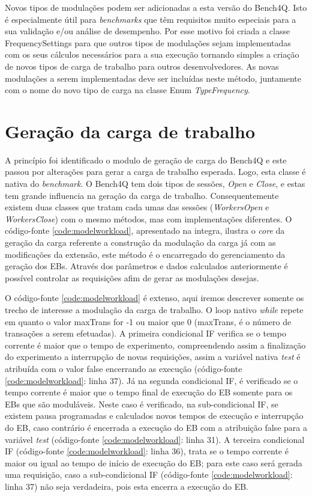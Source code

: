 Novos tipos de modulações podem ser adicionadas a esta versão do Bench4Q. Isto é especialmente útil para \textit{benchmarks} que têm requisitos muito especiais para a sua validação e/ou análise de desempenho. Por esse motivo foi criada a classe \textsf{FrequencySettings} para que outros tipos de modulações sejam implementadas com os seus cálculos necessários para a sua execução tornando simples a criação de novos tipos de carga de trabalho para outros desenvolvedores. As novas modulações a serem implementadas deve ser incluídas neste método, juntamente com o nome do novo tipo de carga na classe Enum \textit{TypeFrequency}.

\section{Geração da carga de trabalho}
A princípio foi identificado o modulo de geração de carga do Bench4Q e este passou por alterações para gerar a carga de trabalho esperada. Logo, esta classe é nativa do \textit{benchmark}. O Bench4Q tem dois tipos de sessões, \textit{Open} e \textit{Close}, e estas tem grande influencia na geração da carga de trabalho. Consequentemente existem duas classes que tratam cada umas das sessões (\textit{WorkersOpen} e \textit{WorkersClose}) com o mesmo métodos, mas com implementações diferentes.
O código-fonte \ref{code:modelworkload}, apresentado na integra, ilustra o \textit{core} da geração da carga referente a construção da modulação da carga já com as modificações da extensão, este método é o encarregado do gerenciamento da geração dos EBs. Através dos parâmetros e dados calculados anteriormente é possível controlar as requisições afim de gerar as modulações desejas.

O código-fonte \ref{code:modelworkload} é extenso, aqui iremos descrever somente os trecho de interesse a modulação da carga de trabalho. O loop nativo \textit{while} repete em quanto o valor \textsf{maxTrans} for -1 ou maior que 0 (\textsf{maxTrans}, é o número de transações a serem efetuadas). A primeira condicional IF verifica se o tempo corrente é maior que o tempo de experimento, compreendendo assim a finalização do experimento a interrupção de novas requisições, assim a variável nativa \textit{test} é atribuída com o valor false encerrando as execução (código-fonte \ref{code:modelworkload}: linha 37). Já na segunda condicional IF, é verificado se o tempo corrente é maior que o tempo final de execução do EB somente para os EBs que são moduláveis. Neste caso é verificado, na sub-condicional IF, se existem pausa programadas e calculados novos tempos de execução e interrupção do EB, caso contrário é encerrada a execução do EB com a atribuição false para a variável \textit{test} (código-fonte \ref{code:modelworkload}: linha 31). A terceira condicional IF (código-fonte \ref{code:modelworkload}: linha 36), trata se o tempo corrente é maior ou igual ao tempo de início de execução do EB; para este caso será gerada uma requisição, caso a sub-condicional IF (código-fonte \ref{code:modelworkload}: linha 37) não seja verdadeira, pois esta encerra a execução do EB.


